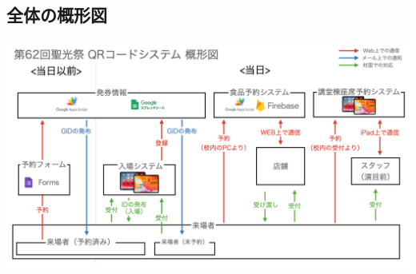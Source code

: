 \documentclass[a4paper]{ltjsreport}
\begin{document}
\subsection{全体の概形図}
\includegraphics[scale=0.15]{assets/qrcode-system-first-look.png}
\end{document}
